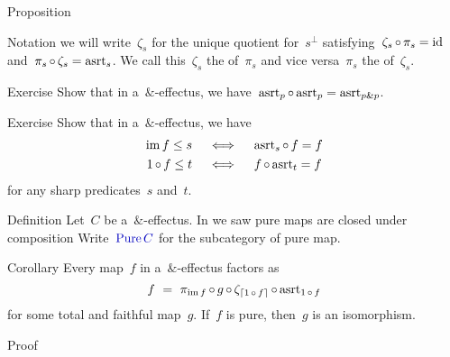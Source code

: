 \documentclass[b]{subfiles}
\begin{document}
\begin{parsec}
\begin{point}{Proposition}
\begin{point}{Notation}
    we will write~$\zeta_s$
    for the unique quotient for~$s^\perp$
    satisfying~$\zeta_s \mathop{\circ} \pi_s = \operatorname{id}$
    and~$\pi_s \mathop{\circ} \zeta_s = \mathrm{asrt}_s$.
We call this~$\zeta_s$
    the  of~$\pi_s$
    and vice versa~$\pi_s$ the 
    of~$\zeta_s$.
\end{point}
\end{point}
\begin{point}{Exercise}%
Show that in a~$\&$-effectus,
    we have~$\mathrm{asrt}_p \mathop{\circ} \mathrm{asrt}_p = \mathrm{asrt}_{p \mathbin{\&} p}$.
\end{point}
\begin{point}{Exercise}%
    Show that in a~$\&$-effectus,
    we have
    \begin{align*}
        \operatorname{im} f \leq s \quad&\iff\quad  \mathrm{asrt}_s \mathop{\circ} f = f \\
        1 \mathop{\circ} f \leq t \quad&\iff\quad  f \mathop{\circ} \mathrm{asrt}_t = f
    \end{align*}
for any sharp predicates~$s$ and~$t$.
\end{point}
\begin{point}{Definition}%
Let~$C$ be a~$\&$-effectus.
In  we saw pure maps are closed under composition
Write~$\Define{\Pure C}$ for the subcategory
    of pure map.
\end{point}
\end{parsec}

\begin{parsec}%
\begin{point}{Corollary}%
Every map~$f$
in a~$\&$-effectus
factors as
    \begin{equation*}
        f \ =\ \pi_{\operatorname{im} f} \mathop{\circ} g \mathop{\circ} \zeta_{\left\lceil1 \mathop{\circ} f\right\rceil} \mathop{\circ} \mathrm{asrt}_{1 \mathop{\circ} f}
    \end{equation*}
    for some total and faithful map~$g$.
If~$f$ is pure, then~$g$ is an isomorphism.
\begin{point}{Proof}%
\end{point}
\end{point}
\end{parsec}
\end{document}
